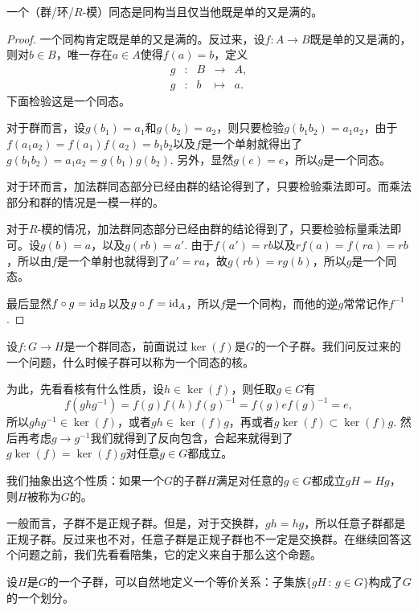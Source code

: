 \begin{pro}
一个（群/环/$R$-模）同态是同构当且仅当他既是单的又是满的。
\end{pro}

\begin{proof}
一个同构肯定既是单的又是满的。反过来，设$f: A\to B$既是单的又是满的，则对$b\in B$，唯一存在$a\in A$使得$f(a)=b$，定义
\[
	\begin{array}{ccccc}
		g &:&B &\to& A,\\
		g &:&b &\mapsto& a.
	\end{array}
\]
下面检验这是一个同态。

对于群而言，设$g(b_1)=a_1$和$g(b_2)=a_2$，则只要检验$g(b_1b_2)=a_1a_2$，由于$f(a_1a_2)=f(a_1)f(a_2)=b_1b_2$以及$f$是一个单射就得出了$g(b_1b_2)=a_1a_2=g(b_1)g(b_2)$. 另外，显然$g(e)=e$，所以$g$是一个同态。

对于环而言，加法群同态部分已经由群的结论得到了，只要检验乘法即可。而乘法部分和群的情况是一模一样的。

对于$R$-模的情况，加法群同态部分已经由群的结论得到了，只要检验标量乘法即可。设$g(b)=a$，以及$g(rb)=a'$. 由于$f(a')=rb$以及$rf(a)=f(ra)=rb$，所以由$f$是一个单射也就得到了$a'=ra$，故$g(rb)=rg(b)$，所以$g$是一个同态。

最后显然$f\circ g =\operatorname{id}_B$以及$g\circ f=\operatorname{id}_A$，所以$f$是一个同构，而他的逆$g$常常记作$f^{-1}$.
\end{proof}

\para 设$f:G\to H$是一个群同态，前面说过$\ker(f)$是$G$的一个子群。我们问反过来的一个问题，什么时候子群可以称为一个同态的核。

为此，先看看核有什么性质，设$h\in \ker(f)$，则任取$g\in G$有
\[
	f\left(ghg^{-1}\right)=f(g)f(h)f(g)^{-1}=f(g)ef(g)^{-1}=e,
\]
所以$ghg^{-1}\in \ker(f)$，或者$gh \in \ker(f)g$，再或者$g\ker(f)\subset \ker(f)g$. 然后再考虑$g\to g^{-1}$我们就得到了反向包含，合起来就得到了$g\ker(f)=\ker(f)g$对任意$g\in G$都成立。

我们抽象出这个性质：如果一个$G$的子群$H$满足对任意的$g\in G$都成立$gH=Hg$，则$H$被称为$G$的。

一般而言，子群不是正规子群。但是，对于交换群，$gh=hg$，所以任意子群都是正规子群。反过来也不对，任意子群是正规子群也不一定是交换群。在继续回答这个问题之前，我们先看看陪集，它的定义来自于那么这个命题。

\begin{pro}
	设$H$是$G$的一个子群，可以自然地定义一个等价关系：子集族$\{gH\,:\, g\in G\}$构成了$G$的一个划分。
\end{pro}

